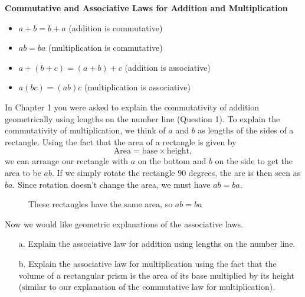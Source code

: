 \begin{tcolorbox}
{\bf Commutative and Associative Laws for Addition and Multiplication}
\begin{itemize}
\item $a+b = b+a$ (addition is commutative)
\item $ab=ba$ (multiplication is commutative)
\item $a+(b+c) = (a+b)+c$ (addition is associative)
\item $a(bc)=(ab)c$ (multiplication is associative)
\end{itemize}
\end{tcolorbox}

In Chapter 1 you were asked to explain the commutativity of addition geometrically using lengths on the number line (Question 1). To explain the commutativity of multiplication, we think of $a$ and $b$ as lengths of the sides of a rectangle. Using the fact that the area of a rectangle is given by
\[
\mbox{Area} = \mbox{base}\times\mbox{height},
\]
we can arrange our rectangle with $a$ on the bottom and $b$ on the side to get the area to be $ab$. If we simply rotate the rectangle $90$ degrees, the are is then seen as $ba$. Since rotation doesn't change the area, we must have $ab = ba$.

\begin{figure}[h]
\centering
{}
\caption{These rectangles have the same area, so $ab=ba$}
\end{figure}


\begin{question} Now we would like geometric explanations of the associative laws.
\begin{enumerate}
\item[a.] Explain the associative law for addition using lengths on the number line.
\item[b.] Explain the associative law for multiplication using the fact that the volume of a rectangular prism is the area of its base multiplied by its height (similar to our explanation of the commutative law for multiplication).
\end{enumerate}
\end{question}

